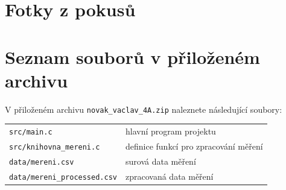 
\chapter{Fotky z pokusů}	
\lipsum[1]
\chapter{Seznam souborů v přiloženém archivu}
V přiloženém archivu \texttt{novak\_vaclav\_4A.zip} naleznete následující soubory:

\begin{center}
\begin{tabular}{@{}l@{\,\dotfill\;}l@{}}
	\texttt{src/main.c}                    & hlavní program projektu \\
	\texttt{src/knihovna\_mereni.c}         & definice funkcí pro zpracování měření \\
	\texttt{data/mereni.csv}                & surová data měření \\
	\texttt{data/mereni\_processed.csv}     & zpracovaná data měření \\
\end{tabular}
\end{center}
